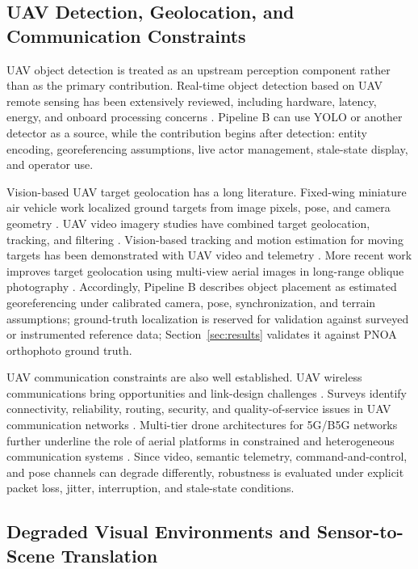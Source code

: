 \documentclass[fleqn]{VRIH2025}
\begin{document}
\subsection{UAV Detection, Geolocation, and Communication Constraints}

UAV object detection is treated as an upstream perception component rather than as the primary contribution. Real-time object detection based on UAV remote sensing has been extensively reviewed, including hardware, latency, energy, and onboard processing concerns \cite{cao2023uavdetection}. Pipeline B can use YOLO or another detector as a source, while the contribution begins after detection: entity encoding, georeferencing assumptions, live actor management, stale-state display, and operator use.

Vision-based UAV target geolocation has a long literature. Fixed-wing miniature air vehicle work localized ground targets from image pixels, pose, and camera geometry \cite{barber2006geolocation}. UAV video imagery studies have combined target geolocation, tracking, and filtering \cite{hosseinpoor2016geolocation}. Vision-based tracking and motion estimation for moving targets has been demonstrated with UAV video and telemetry \cite{dobrokhodov2008tracking}. More recent work improves target geolocation using multi-view aerial images in long-range oblique photography \cite{liu2024multiview}. Accordingly, Pipeline B describes object placement as estimated georeferencing under calibrated camera, pose, synchronization, and terrain assumptions; ground-truth localization is reserved for validation against surveyed or instrumented reference data; Section~\ref{sec:results} validates it against PNOA orthophoto ground truth.

UAV communication constraints are also well established. UAV wireless communications bring opportunities and link-design challenges \cite{zeng2016uavcomm}. Surveys identify connectivity, reliability, routing, security, and quality-of-service issues in UAV communication networks \cite{gupta2016uavcomm,hayat2016uavnetworks}. Multi-tier drone architectures for 5G/B5G networks further underline the role of aerial platforms in constrained and heterogeneous communication systems \cite{sekander2018multitier}. Since video, semantic telemetry, command-and-control, and pose channels can degrade differently, robustness is evaluated under explicit packet loss, jitter, interruption, and stale-state conditions.

\subsection{Degraded Visual Environments and Sensor-to-Scene Translation}
\end{document}
